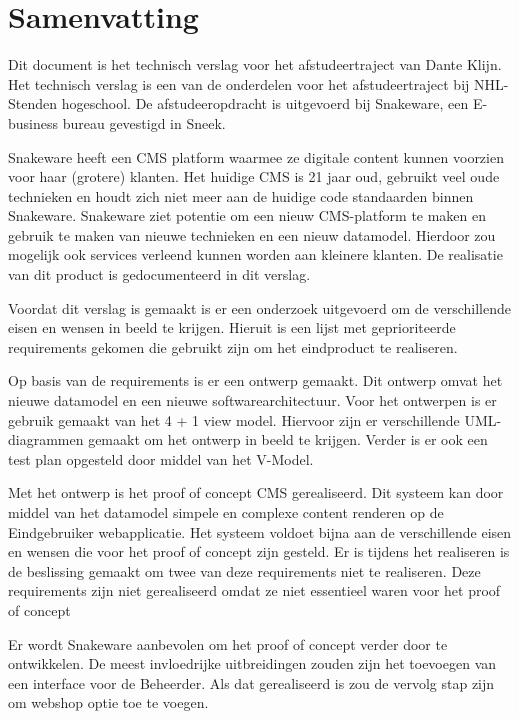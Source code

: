 \chapter*{Samenvatting}
Dit document is het technisch verslag voor het afstudeertraject van Dante Klijn.
Het technisch verslag is een van de onderdelen voor het afstudeertraject bij NHL-Stenden hogeschool.
De afstudeeropdracht is uitgevoerd bij Snakeware, een E-business bureau gevestigd in Sneek.

\whitespace
Snakeware heeft een \gls{CMS} platform waarmee ze digitale content kunnen voorzien voor haar (grotere) klanten.
Het huidige \gls{CMS} is 21 jaar oud, gebruikt veel oude technieken en houdt zich niet meer aan de huidige code standaarden binnen Snakeware.
Snakeware ziet potentie om een nieuw \gls{CMS}-platform te maken en gebruik te maken van nieuwe technieken en een nieuw datamodel.
Hierdoor zou mogelijk ook services verleend kunnen worden aan kleinere klanten.
De realisatie van dit product is gedocumenteerd in dit verslag.

\whitespace
Voordat dit verslag is gemaakt is er een onderzoek uitgevoerd om de verschillende eisen en wensen in beeld te krijgen.
Hieruit is een lijst met geprioriteerde requirements gekomen die gebruikt zijn om het eindproduct te realiseren.

\whitespace
Op basis van de requirements is er een ontwerp gemaakt.
Dit ontwerp omvat het nieuwe datamodel en een nieuwe softwarearchitectuur.
Voor het ontwerpen is er gebruik gemaakt van het 4 + 1 view model.
Hiervoor zijn er verschillende UML-diagrammen gemaakt om het ontwerp in beeld te krijgen.
Verder is er ook een test plan opgesteld door middel van het V-Model.

\whitespace
Met het ontwerp is het proof of concept \gls{CMS} gerealiseerd.
Dit systeem kan door middel van het datamodel simpele en complexe content renderen op de \gls{Eindgebruiker} webapplicatie.
Het systeem voldoet bijna aan de verschillende eisen en wensen die voor het proof of concept zijn gesteld. 
Er is tijdens het realiseren is de beslissing gemaakt om twee van deze requirements niet te realiseren.
Deze requirements zijn niet gerealiseerd omdat ze niet essentieel waren voor het proof of concept

\whitespace
Er wordt Snakeware aanbevolen om het proof of concept verder door te ontwikkelen.
De meest invloedrijke uitbreidingen zouden zijn het toevoegen van een interface voor de \gls{Beheerder}.
Als dat gerealiseerd is zou de vervolg stap zijn om webshop optie toe te voegen.
